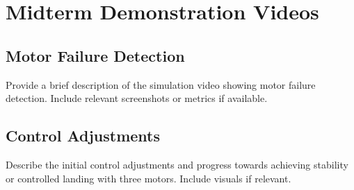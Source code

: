 \chapter{Midterm Demonstration Videos}

    \section{Motor Failure Detection}
    Provide a brief description of the simulation video showing motor failure detection. Include relevant screenshots or metrics if available.

    \section{Control Adjustments}
    Describe the initial control adjustments and progress towards achieving stability or controlled landing with three motors. Include visuals if relevant.

